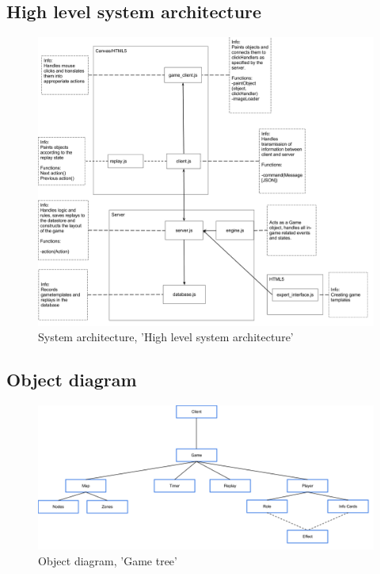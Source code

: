 \subsection{High level system architecture}

\begin{figure}[H]
  \centering
    \includegraphics[width=1.0\textwidth]{img/highlevelarch.png}
  \caption{System architecture, 'High level system architecture'} 
  \label{fig:highsysarch}
\end{figure}

\subsection{Object diagram}

\begin{figure}[H]
  \centering
    \includegraphics[width=1.0\textwidth]{img/GameTree.png}
  \caption{Object diagram, 'Game tree'} 
  \label{fig:gametree}
\end{figure}


